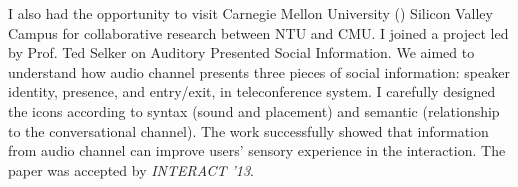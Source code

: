 \noindent
I also had the opportunity to visit Carnegie Mellon University () Silicon Valley Campus for collaborative research between NTU and CMU. 
I joined a project led by Prof. Ted Selker on Auditory Presented Social Information. 
We aimed to understand how audio channel presents three pieces of social information: 
speaker identity, presence, and entry/exit, in teleconference system. 
I carefully designed the icons according to syntax (sound and placement) and semantic (relationship to the conversational channel). 
The work successfully showed that information from audio channel can improve users' sensory experience in the interaction. 
The paper was accepted by \emph{INTERACT '13}. \\





